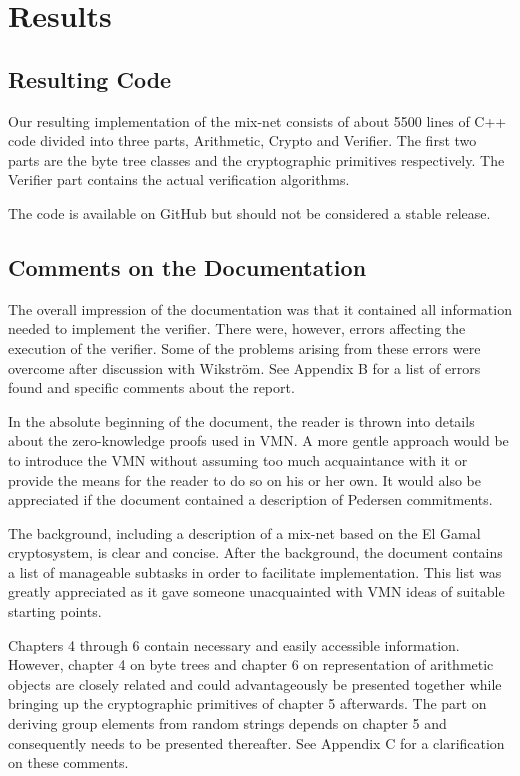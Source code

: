 \section{Results}

\subsection{Resulting Code}

Our resulting implementation of the mix-net consists of about 5500
lines of C++ code divided into three parts, Arithmetic, Crypto and
Verifier. The first two parts are the byte tree classes and the
cryptographic primitives respectively. The Verifier part contains the
actual verification algorithms.

The code is available on GitHub\cite{github} but should not be
considered a stable release.


\subsection{Comments on the Documentation}

The overall impression of the documentation was that it contained all
information needed to implement the verifier. There were, however,
errors affecting the execution of the verifier. Some of the problems
arising from these errors were overcome after discussion with
Wikström. See Appendix B for a list of errors found and specific
comments about the report.

In the absolute beginning of the document, the reader is thrown into
details about the zero-knowledge proofs used in VMN. A more gentle
approach would be to introduce the VMN without assuming too much
acquaintance with it or provide the means for the reader to do so on
his or her own. It would also be appreciated if the document contained
a description of Pedersen commitments.

The background, including a description of a mix-net based on the El
Gamal cryptosystem, is clear and concise. After the background, the
document contains a list of manageable subtasks in order to facilitate
implementation. This list was greatly appreciated as it gave someone
unacquainted with VMN ideas of suitable starting points.

Chapters 4 through 6 contain necessary and easily accessible
information. However, chapter 4 on byte trees and chapter 6 on
representation of arithmetic objects are closely related and could
advantageously be presented together while bringing up the
cryptographic primitives of chapter 5 afterwards. The part on deriving
group elements from random strings depends on chapter 5 and
consequently needs to be presented thereafter. See Appendix C for a
clarification on these comments.

